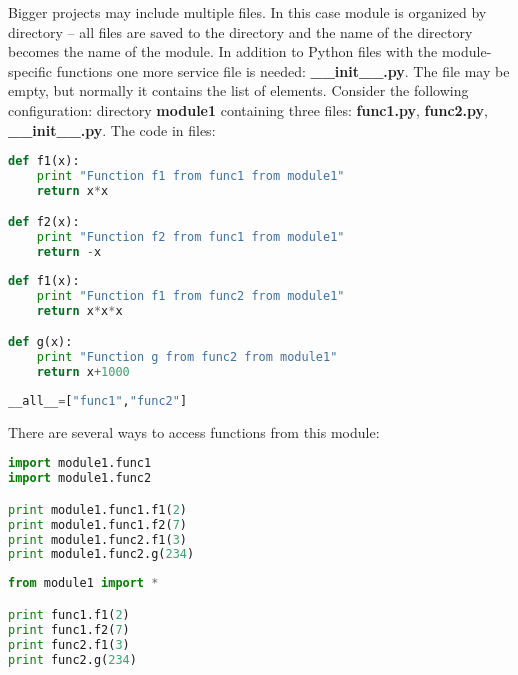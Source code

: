 Bigger projects may include multiple files. In this case
module is organized by directory -- all files are saved to
the directory and the name of the directory becomes the
name of the module. In addition to Python files with
the module-specific functions one more service file is needed:
\textbf{{\_\_}init{\_\_}.py}. The file may be empty, but normally
it contains the list of elements. Consider the following
configuration: directory \textbf{module1} containing
three files: \textbf{func1.py}, \textbf{func2.py}, 
\textbf{{\_\_}init{\_\_}.py}. The code in files:

\begin{lstlisting}[language=Python,style=codelst2,caption={Python: sample module -- file \textbf{finc1.py}}]
def f1(x):
    print "Function f1 from func1 from module1"
    return x*x

def f2(x):
    print "Function f2 from func1 from module1"
    return -x
\end{lstlisting}

\begin{lstlisting}[language=Python,style=codelst2,caption={Python: sample module -- file \textbf{finc2.py}}]
def f1(x):
    print "Function f1 from func2 from module1"
    return x*x*x

def g(x):
    print "Function g from func2 from module1"
    return x+1000
\end{lstlisting}

\begin{lstlisting}[language=Python,style=codelst2,caption={Python: sample module -- file \textbf{{\_\_}init{\_\_}.py}}]
__all__=["func1","func2"]
\end{lstlisting}

There are several ways to access functions from this module:

\newpage

\begin{lstlisting}[language=Python,style=codelst2,caption={Python: accessing module functions - 1}]
import module1.func1
import module1.func2

print module1.func1.f1(2)
print module1.func1.f2(7)
print module1.func2.f1(3)
print module1.func2.g(234)
\end{lstlisting}

\begin{lstlisting}[language=Python,style=codelst2,caption={Python: accessing module functions - 2}]
from module1 import *

print func1.f1(2)
print func1.f2(7)
print func2.f1(3)
print func2.g(234)
\end{lstlisting}


